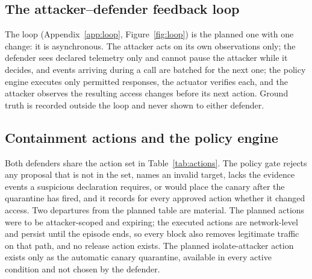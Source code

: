 \documentclass[10pt,a4paper]{article}
\begin{document}
\subsection{The attacker--defender feedback loop}\label{sec:loop}

The loop (Appendix~\ref{app:loop}, Figure~\ref{fig:loop}) is the planned one with one change: it is asynchronous. The attacker acts on its own observations only; the defender sees declared telemetry only and cannot pause the attacker while it decides, and events arriving during a call are batched for the next one; the policy engine executes only permitted responses, the actuator verifies each, and the attacker observes the resulting access changes before its next action. Ground truth is recorded outside the loop and never shown to either defender.

\subsection{Containment actions and the policy engine}\label{sec:actions}

Both defenders share the action set in Table~\ref{tab:actions}. The policy gate rejects any proposal that is not in the set, names an invalid target, lacks the evidence events a suspicious declaration requires, or would place the canary after the quarantine has fired, and it records for every approved action whether it changed access. Two departures from the planned table are material. The planned actions were to be attacker-scoped and expiring; the executed actions are network-level and persist until the episode ends, so every block also removes legitimate traffic on that path, and no release action exists. The planned isolate-attacker action exists only as the automatic canary quarantine, available in every active condition and not chosen by the defender.
\end{document}
